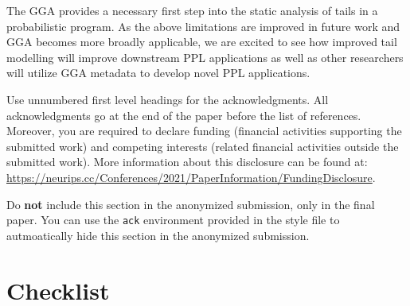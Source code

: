 The GGA provides a necessary first step into the static analysis of tails in
a probabilistic program.
As the above limitations are improved in future work and GGA becomes more broadly applicable,
we are excited to see how improved tail modelling will improve downstream PPL applications
as well as
other researchers will utilize GGA metadata to develop
novel PPL applications.

\begin{ack}
	Use unnumbered first level headings for the acknowledgments. All acknowledgments
	go at the end of the paper before the list of references. Moreover, you are required to declare
	funding (financial activities supporting the submitted work) and competing interests (related financial activities outside the submitted work).
	More information about this disclosure can be found at: \url{https://neurips.cc/Conferences/2021/PaperInformation/FundingDisclosure}.

	Do {\bf not} include this section in the anonymized submission, only in the final paper. You can use the \texttt{ack} environment provided in the style file to autmoatically hide this section in the anonymized submission.
\end{ack}




{
\small


}
\section*{Checklist}



